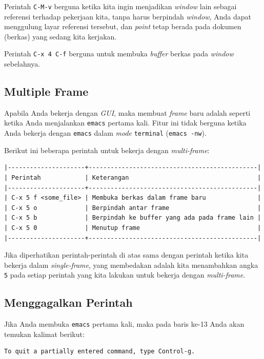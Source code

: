 \documentclass{article}
\begin{document}
Perintah \verb=C-M-v= berguna ketika kita ingin menjadikan \emph{window} lain
sebagai referensi terhadap pekerjaan kita, tanpa harus berpindah \emph{window},
Anda dapat menggulung layar referensi tersebut, dan \emph{point} tetap berada 
pada dokumen (berkas) yang sedang kita kerjakan.

Perintah \verb=C-x 4 C-f= berguna untuk membuka \emph{buffer} berkas pada
\emph{window} sebelahnya.

\subsection{Multiple Frame}
Apabila Anda bekerja dengan \emph{GUI}, maka membuat \emph{frame} baru adalah
seperti ketika Anda menjalankan \verb=emacs= pertama kali. Fitur ini tidak 
berguna ketika Anda bekerja dengan \verb=emacs= dalam \emph{mode} 
\verb=terminal= (\verb=emacs -nw=).

Berikut ini beberapa perintah untuk bekerja dengan \emph{multi-frame}:

\begin{verbatim}
|---------------------+----------------------------------------------|
| Perintah            | Keterangan                                   |
|---------------------+----------------------------------------------|
| C-x 5 f <some_file> | Membuka berkas dalam frame baru              |
| C-x 5 o             | Berpindah antar frame                        |
| C-x 5 b             | Berpindah ke buffer yang ada pada frame lain |
| C-x 5 0             | Menutup frame                                |
|---------------------+----------------------------------------------|
\end{verbatim}

Jika diperhatikan perintah-perintah di atas sama dengan perintah ketika kita
bekerja dalam \emph{single-frame}, yang membedakan adalah kita menambahkan
angka \verb=5= pada setiap perintah yang kita lakukan untuk bekerja dengan 
\emph{multi-frame}.

\subsection{Menggagalkan Perintah}
Jika Anda membuka \verb=emacs= pertama kali, maka pada baris ke-13 Anda akan
temukan kalimat berikut:

\begin{verbatim}
To quit a partially entered command, type Control-g.
\end{verbatim}
\end{document}

